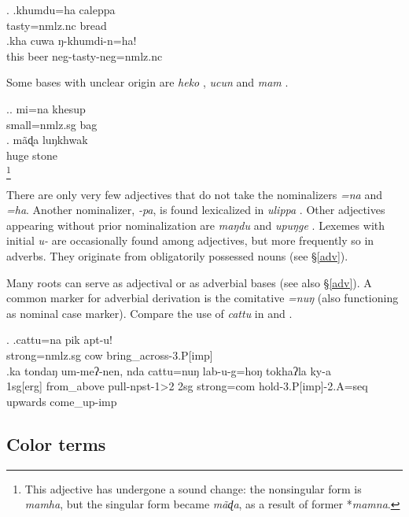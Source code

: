 \ex. \ag.khumdu=ha caleppa\\
tasty{\sc =nmlz.nc} bread\\
\bg.kha cuwa ŋ-khumdi-n=ha!\\
this beer {\sc neg-}tasty{\sc -neg=nmlz.nc}\\

  
Some bases with  unclear origin are \emph{heko} , \emph{ucun}  and \emph{mam} .

\ex.\ag. mi=na khesup\\
small{\sc =nmlz.sg} bag\\
\bg. mãɖa luŋkhwak\\
	huge{\sc [nmlz.sg]} stone\\
	\footnote{This adjective has undergone a sound change: the nonsingular form is \emph{mamha}, but the singular form became \emph{mãɖa}, as a result of former *\emph{mamna}.}

	
There are only very few adjectives that do not take the nominalizers \emph{=na} and \emph{=ha}. Another nominalizer, \emph{-pa}, is found lexicalized in \emph{ulippa} . Other adjectives appearing without prior nominalization are \emph{maŋdu}  and \emph{upuŋge} . Lexemes with initial \emph{u-} are occasionally found among adjectives, but more frequently so in adverbs. They originate from obligatorily possessed nouns (see §\ref{adv}).


	Many roots can serve as adjectival or as adverbial bases (see also  §\ref{adv}). A common marker for adverbial derivation is the comitative \emph{=nuŋ} (also functioning as nominal case marker). Compare the use of \emph{cattu} in \Next[a] and \Next[b].
	
	\ex. \ag.cattu=na pik apt-u!\\
	strong{\sc =nmlz.sg} cow bring\_across{\sc -3.P[imp]}\\
	\bg.ka       tondaŋ    um-meʔ-nen,       nda cattu=nuŋ    lab-u-g=hoŋ                tokhaʔla ky-a\\
	{\sc 1sg[erg]} from\_above pull{\sc -npst-1>2} {\sc 2sg} strong{\sc =com} hold{\sc -3.P[imp]-2.A=seq} upwards come\_up{\sc -imp}\\
	 

	
\subsection{Color terms}\label{sec-color}

